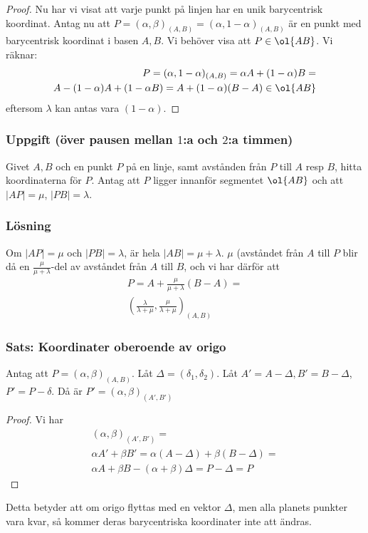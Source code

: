 \begin{proof}
    Nu har vi visat att varje punkt på linjen har en unik barycentrisk koordinat.
    Antag nu att $P = (\alpha, \beta)_{(A, B)} = (\alpha, 1-\alpha)_{(A, B)}$ är en punkt
    med barycentrisk koordinat i basen $A, B$. Vi behöver visa att $P\in \ol{AB}$.
    Vi räknar:
    \begin{eqnarray*}
    P = (\alpha, 1-\alpha)_{(A, B)} = \alpha A + (1-\alpha) B = \\
    A - (1-\alpha) A + (1-\alpha B) = A + (1-\alpha)(B-A) \in \ol{AB}
    \end{eqnarray*}
    eftersom $\lambda$ kan antas vara $(1-\alpha)$.
\end{proof}


\subsubsection{Uppgift (över pausen mellan $1$:a och $2$:a timmen)}
\label{sssec:ratio}
Givet $A,B$ och en punkt $P$ på en linje, samt avstånden från $P$ till $A$ resp $B$, hitta koordinaterna för $P$.
Antag att $P$ ligger innanför segmentet $\ol{AB}$ och att $|AP| = \mu$, $|PB| = \lambda$.
\myLine
\subsubsection*{Lösning}
Om $|AP| = \mu$ och $|PB| = \lambda$, är hela $|AB| = \mu + \lambda$.
$\mu$ (avståndet från $A$ till $P$ blir då en $\frac{\mu}{\mu + \lambda}$-del av
avståndet från $A$ till $B$, och vi har därför att
\begin{eqnarray*}
P = A + \frac{\mu}{\mu + \lambda} (B - A) =\\
\left( \frac{\lambda}{\lambda + \mu}, \frac{\mu}{\lambda + \mu} \right)_{(A, B)} 
\end{eqnarray*}

\subsubsection{Sats: Koordinater oberoende av origo}
\begin{theorem}
\label{thm:dim-1-oberoende-av-origo}
    Antag att $P = (\alpha, \beta)_{(A, B)}$.
    Låt $\Delta = (\delta_1, \delta_2)$.
    Låt $A' = A-\Delta, B' = B - \Delta$,
    $P' = P-\delta$.
    Då är $P' = (\alpha, \beta)_{(A', B')}$
\end{theorem}
\begin{proof}
    Vi har 
    \begin{eqnarray*}
    (\alpha, \beta)_{(A', B')} = \\
    \alpha A' + \beta B' = \alpha(A - \Delta) + \beta (B - \Delta) = \\
    \alpha A + \beta B - (\alpha + \beta) \Delta = P - \Delta = P
    \end{eqnarray*}
\end{proof}
Detta betyder att om origo flyttas med en vektor $\Delta$, men alla planets punkter vara kvar,
så kommer deras barycentriska koordinater inte att ändras.

